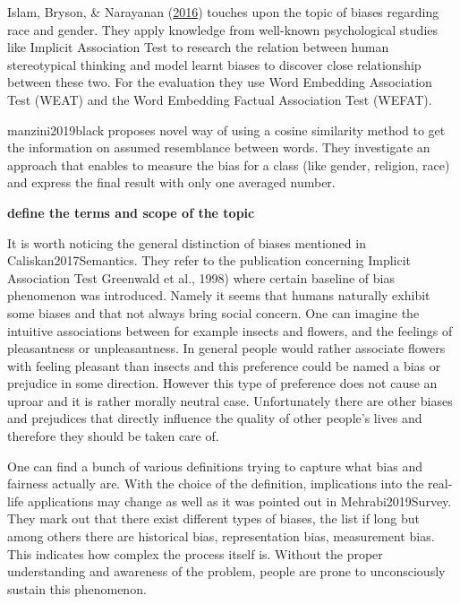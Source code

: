 \documentclass[]{book}
\begin{document}
Islam, Bryson, \& Narayanan
(\protect\hyperlink{ref-Caliskan2017Semantics}{2016}) touches upon the
topic of biases regarding race and gender. They apply knowledge from
well-known psychological studies like Implicit Association Test to
research the relation between human stereotypical thinking and model
learnt biases to discover close relationship between these two. For the
evaluation they use Word Embedding Association Test (WEAT) and the Word
Embedding Factual Association Test (WEFAT).

manzini2019black proposes novel way of using a cosine similarity method
to get the information on assumed resemblance between words. They
investigate an approach that enables to measure the bias for a class
(like gender, religion, race) and express the final result with only one
averaged number. \newline

\textbf{define the terms and scope of the topic}

It is worth noticing the general distinction of biases mentioned in
Caliskan2017Semantics. They refer to the publication concerning Implicit
Association Test Greenwald et al., 1998) where certain baseline of bias
phenomenon was introduced. Namely it seems that humans naturally exhibit
some biases and that not always bring social concern. One can imagine
the intuitive associations between for example insects and flowers, and
the feelings of pleasantness or unpleasantness. In general people would
rather associate flowers with feeling pleasant than insects and this
preference could be named a bias or prejudice in some direction. However
this type of preference does not cause an uproar and it is rather
morally neutral case. Unfortunately there are other biases and
prejudices that directly influence the quality of other people's lives
and therefore they should be taken care of.

One can find a bunch of various definitions trying to capture what bias
and fairness actually are. With the choice of the definition,
implications into the real-life applications may change as well as it
was pointed out in Mehrabi2019Survey. They mark out that there exist
different types of biases, the list if long but among others there are
historical bias, representation bias, measurement bias. This indicates
how complex the process itself is. Without the proper understanding and
awareness of the problem, people are prone to unconsciously sustain this
phenomenon.
\end{document}

